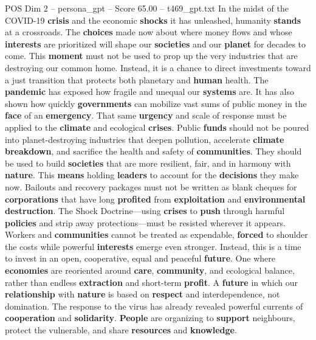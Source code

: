 \begin{textsample}{POS Dim 2 – persona\_gpt – Score 65.00 – t469\_gpt.txt}  \label{ex:f2_pos_005}
In the midst of the COVID-19 \textbf{crisis} and the economic \textbf{shocks} it has unleashed, humanity \textbf{stands} at a crossroads.
The \textbf{choices} made now about where money flows and whose \textbf{interests} are prioritized will shape our \textbf{societies} and our \textbf{planet} for decades to come.
This \textbf{moment} must not be used to prop up the very industries that are destroying our common home.
Instead, it is a chance to direct investments toward a just transition that protects both planetary and \textbf{human} health.
The \textbf{pandemic} has exposed how fragile and unequal our \textbf{systems} are.
It has also shown how quickly \textbf{governments} can mobilize vast sums of public money in the \textbf{face} of an \textbf{emergency}.
That same \textbf{urgency} and scale of response must be applied to the \textbf{climate} and ecological \textbf{crises}.
Public \textbf{funds} should not be poured into planet-destroying industries that deepen pollution, accelerate \textbf{climate} \textbf{breakdown}, and sacrifice the health and safety of \textbf{communities}.
They should be used to build \textbf{societies} that are more resilient, fair, and in harmony with \textbf{nature}.
This \textbf{means} holding \textbf{leaders} to account for the \textbf{decisions} they make now.
Bailouts and recovery packages must not be written as blank cheques for \textbf{corporations} that have long \textbf{profited} from \textbf{exploitation} and \textbf{environmental} \textbf{destruction}.
The Shock Doctrine—using \textbf{crises} to \textbf{push} through harmful \textbf{policies} and strip away protections—must be resisted wherever it appears.
Workers and \textbf{communities} cannot be treated as expendable, \textbf{forced} to shoulder the costs while powerful \textbf{interests} emerge even stronger.
Instead, this is a time to invest in an open, cooperative, equal and peaceful \textbf{future}.
One where \textbf{economies} are reoriented around \textbf{care}, \textbf{community}, and ecological balance, rather than endless \textbf{extraction} and short-term \textbf{profit}.
A \textbf{future} in which our \textbf{relationship} with \textbf{nature} is based on \textbf{respect} and interdependence, not domination.
The response to the virus has already revealed powerful currents of \textbf{cooperation} and \textbf{solidarity}. \textbf{People} are organizing to \textbf{support} neighbours, protect the vulnerable, and share \textbf{resources} and \textbf{knowledge}.

\end{textsample}
